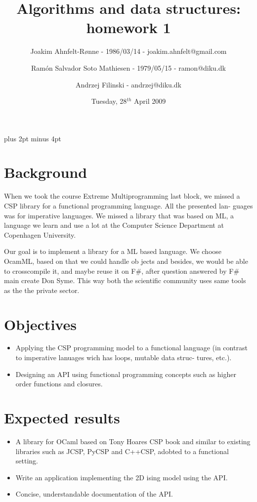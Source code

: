 \documentclass[a4paper,12pt]{article}
\title{Algorithms and data structures: homework 1}
\author{Joakim Ahnfelt-Rønne - 1986/03/14 - joakim.ahnfelt@gmail.com \and 
        Ramón Salvador Soto Mathiesen - 1979/05/15 - ramon@diku.dk \and
        Andrzej Filinski - andrzej@diku.dk}
\date{Tuesday, 28$^{th}$ April 2009}
\begin{document}
\parindent=0pt
\parskip=8pt plus 2pt minus 4pt

\maketitle
\newpage

\section*{Background}
When we took the course Extreme Multiprogramming last block, we missed 
a CSP library for a functional programming language. All the presented lan- 
guages was for imperative languages. We missed a library that was based on 
ML, a language we learn and use a lot at the Computer Science Department 
at Copenhagen University.

Our goal is to implement a library for a ML based language. We choose 
OcamML, based on that we could handle ob jects and besides, we would be 
able to crosscompile it, and maybe reuse it on F\#, after question answered 
by F\# main create Don Syme. This way both the scientific community uses 
same tools as the the private sector. 

\section*{Objectives}
\begin{itemize}
 \item Applying the CSP programming model to a functional language (in 
   contrast to imperative lanuages wich has loops, mutable data struc- 
   tures, etc.).
 \item Designing an API using functional programming concepts such as higher 
   order functions and closures.
\end{itemize}
 
\section*{Expected results}
\begin{itemize}
 \item A library for OCaml based on Tony Hoares CSP book and similar to 
   existing libraries such as JCSP, PyCSP and C++CSP, adobted to a 
   functional setting. 
 \item Write an application implementing the 2D ising model using the API.
 \item Concise, understandable documentation of the API.
\end{itemize}
\end{document}
